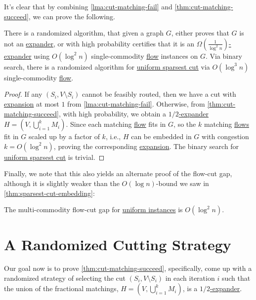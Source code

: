 It's clear that by combining \autoref{lma:cut-matching-fail} and \autoref{thm:cut-matching-succeed}, we can prove the following.

\begin{corollary}\label{col:cut-matching-sparsest-cut}
	There is a randomized algorithm, that given a graph \(G\), either proves that \(G\) is not an \hyperref[def:expander]{expander}, or with high probability certifies that it is an \hyperref[def:expander]{\(\Omega (\frac{1}{\log ^2 n})\)-expander} using \(O(\log ^2 n)\) single-commodity \hyperref[def:flow]{flow} instances on \(G\). Via binary search, there is a randomized algorithm for \hyperref[prb:sparsest-cut]{uniform sparsest cut} via \(O(\log ^3 n)\) single-commodity \hyperref[def:flow]{flow}.
\end{corollary}
\begin{proof}
	If any \((S_i, V\setminus S_i)\) cannot be feasibly routed, then we have a cut with \hyperref[def:expansion]{expansion} at most \(1\) from \autoref{lma:cut-matching-fail}. Otherwise, from \autoref{thm:cut-matching-succeed}, with high probability, we obtain a \hyperref[def:expander]{\(1 / 2\)-expander} \(H = (V, \bigcup_{i=1}^{k} M_i)\). Since each matching \hyperref[def:flow]{flow} fits in \(G\), so the \(k\) matching \hyperref[def:flow]{flows} fit in \(G\) scaled up by a factor of \(k\), i.e., \(H\) can be embedded in \(G\) with congestion \(k = O(\log ^2 n)\), proving the corresponding \hyperref[def:expansion]{expansion}. The binary search for \hyperref[prb:sparsest-cut]{uniform sparsest cut} is trivial.
\end{proof}

Finally, we note that this also yields an alternate proof of the flow-cut gap, although it is slightly weaker than the \(O(\log n)\)-bound we saw in \autoref{thm:sparsest-cut-embedding}:

\begin{corollary}
	The multi-commodity flow-cut gap for \hyperref[prb:sparsest-cut]{uniform instances} is \(O(\log ^2 n)\).
\end{corollary}

\section{A Randomized Cutting Strategy}
Our goal now is to prove \autoref{thm:cut-matching-succeed}, specifically, come up with a randomized strategy of selecting the cut \((S_i, V\setminus S_i)\) in each iteration \(i\) such that the union of the fractional matchings, \(H = (V, \bigcup_{i=1}^{k} M_i)\), is a \hyperref[def:expander]{\(1 / 2\)-expander}.

